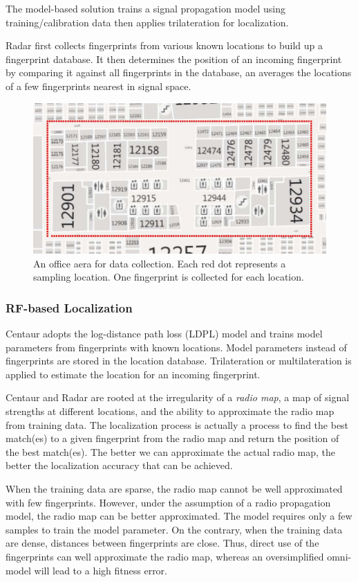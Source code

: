 \documentclass[a4paper, 11pt]{article} %
\begin{document}
The model-based solution trains a signal propagation model using training/calibration data then applies trilateration for localization. 

Radar first collects fingerprints from various known locations to build up a fingerprint database. It then determines the position of an incoming fingerprint by comparing it against all fingerprints in the database, an averages the locations of a few fingerprints nearest in signal space.

\begin{figure}[h]
	\centering 
	\includegraphics[width=0.8\linewidth]{Figure1.jpg}
	\caption{An office aera for data collection. Each red dot represents a sampling location. One fingerprint is collected for each location.\cite{Modellet14}}
	\label{fig:subfig}
\end{figure}

\subsubsection{RF-based Localization \cite{Centaur12}}
Centaur adopts the log-distance path loss (LDPL) model and trains model parameters from fingerprints with known locations. Model parameters instead of fingerprints are stored in the location database. Trilateration or multilateration is applied to estimate the location for an incoming fingerprint.

Centaur and Radar are rooted at the irregularity of a \emph{radio map}, a map of signal strengths at different locations, and the ability to approximate the radio map from training data. The localization process is actually a process to find the best match(es) to a given fingerprint from the radio map and return the position of the best match(es). The better we can approximate the actual radio map, the better the localization accuracy that can be achieved.

When the training data are sparse, the radio map cannot be well approximated with few fingerprints. However, under the assumption of a radio propagation model, the radio map can be better approximated. The model requires only a few samples to train the model parameter. On the contrary, when the training data are dense, distances between fingerprints are close. Thus, direct use of the fingerprints can well approximate the radio map, whereas an oversimplified omni-model will lead to a high fitness error.\cite{Modellet14}
\end{document}
